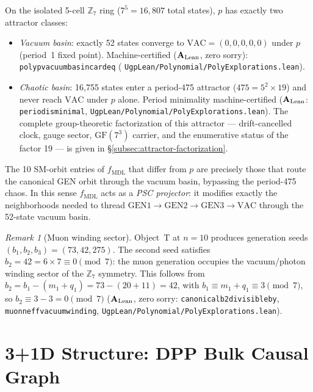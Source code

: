 \documentclass[11pt]{article}
\theoremstyle{remark}
\newtheorem{remark}[theorem]{Remark}
\newcommand{\ZS}{\ensuremath{\mathbb{Z}_7}}
\newcommand{\GF}[1]{\ensuremath{\mathrm{GF}(#1)}}
\newcommand{\lean}[1]{%
  \penalty-100
  \begingroup\def\_{\textunderscore\allowbreak}\texttt{#1}\endgroup}
\newcommand{\fmdl}{\ensuremath{f_{\mathrm{MDL}}}}
\newcommand{\CatAL}{\texorpdfstring{\ensuremath{\textbf{A}_{\rm Lean}}}{A-Lean}}
\begin{document}
On the isolated 5-cell $\ZS$ ring ($7^5 = 16{,}807$ total states), $p$ has
exactly two attractor classes:
\begin{itemize}[leftmargin=2em,itemsep=2pt]
  \item \emph{Vacuum basin}: exactly 52 states converge to
    $\mathrm{VAC} = (0,0,0,0,0)$ under $p$ (period~1 fixed point).
    Machine-certified (\CatAL{}, zero sorry):
    \lean{poly\_p\_vacuum\_basin\_card\_eq\_52}
    (\lean{UgpLean/Polynomial/PolyExplorations.lean}).
  \item \emph{Chaotic basin}: 16{,}755 states enter a period-475 attractor
    ($475 = 5^2 \times 19$) and never reach
    $\mathrm{VAC}$ under $p$ alone.
    Period minimality machine-certified (\CatAL{}:
    \lean{period\_475\_is\_minimal},
    \lean{UgpLean/Polynomial/PolyExplorations.lean}).
    The complete group-theoretic factorization of this attractor ---
    drift-cancelled clock, gauge sector, $\GF{7^3}$ carrier, and the
    enumerative status of the factor 19 --- is given in
    §\ref{subsec:attractor-factorization}.
\end{itemize}
The 10 SM-orbit entries of $\fmdl{}$ that differ from $p$ are precisely those
that route the canonical GEN orbit through the vacuum basin,
bypassing the period-475 chaos. In this sense $\fmdl{}$ acts as a
\emph{PSC projector}: it modifies exactly the neighborhoods needed to thread
$\mathrm{GEN}1 \to \mathrm{GEN}2 \to \mathrm{GEN}3 \to \mathrm{VAC}$
through the 52-state vacuum basin.

\begin{remark}[Muon winding sector]
\label{rem:muonwinding}
Object~T at $n = 10$ produces generation seeds $(b_1, b_2, b_3) = (73, 42, 275)$.
The second seed satisfies $b_2 = 42 = 6 \times 7 \equiv 0 \pmod{7}$: the muon
generation occupies the vacuum/photon winding sector of the $\ZS$ symmetry.
This follows from $b_2 = b_1 - (m_1 + q_1) = 73 - (20 + 11) = 42$, with
$b_1 \equiv m_1 + q_1 \equiv 3 \pmod{7}$, so $b_2 \equiv 3 - 3 = 0 \pmod{7}$
(\CatAL{}, zero sorry: \lean{canonical\_b2\_divisible\_by\_7},
\lean{muon\_neff\_vacuum\_winding},
\lean{UgpLean/Polynomial/PolyExplorations.lean}).
\end{remark}

\section{3+1D Structure: DPP Bulk Causal Graph}
\label{sec:dpp}
\end{document}
